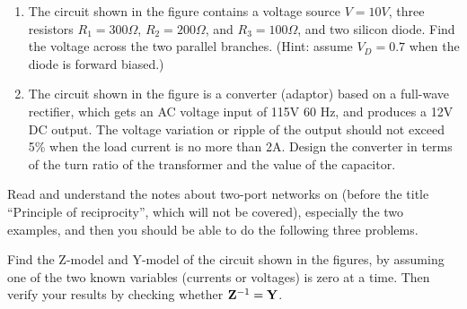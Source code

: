 \begin{enumerate}


\item The circuit shown in the figure contains a voltage source $V=10V$,
three resistors $R_1=300\Omega$, $R_2=200\Omega$, and $R_3=100\Omega$, 
and two silicon diode. Find the voltage across the two parallel branches.
(Hint: assume $V_D=0.7$ when the diode is forward biased.)



\item The circuit shown in the figure is a converter (adaptor) based on
a full-wave rectifier, which gets an AC voltage input of 115V 60 Hz, and
produces a 12V DC output. The voltage variation or ripple of the output
should not exceed 5\% when the load current is no more than 2A. Design 
the converter in terms of the turn ratio of the transformer and the 
value of the capacitor. 


\end{enumerate}





\item Read and understand the notes about two-port networks on 
(before the title ``Principle of reciprocity'', which will not be covered), especially
the two examples, and then you should be able to do the following three problems.

Find the Z-model and Y-model of the circuit shown in the figures, by
assuming one of the two known variables (currents or voltages) is zero at
a time. Then verify your results by checking whether ${\bf Z}^{-1}={\bf Y}$.

